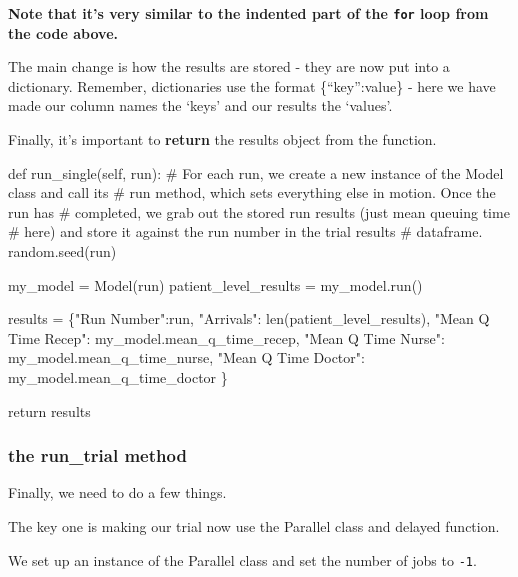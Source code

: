 \documentclass[
  letterpaper,
  DIV=11,
  numbers=noendperiod]{scrreprt}
\newenvironment{Shaded}{\begin{snugshade}}{\end{snugshade}}
\newcommand{\BuiltInTok}[1]{\textcolor[rgb]{0.00,0.23,0.31}{#1}}
\newcommand{\CommentTok}[1]{\textcolor[rgb]{0.37,0.37,0.37}{#1}}
\newcommand{\ControlFlowTok}[1]{\textcolor[rgb]{0.00,0.23,0.31}{#1}}
\newcommand{\KeywordTok}[1]{\textcolor[rgb]{0.00,0.23,0.31}{#1}}
\newcommand{\NormalTok}[1]{\textcolor[rgb]{0.00,0.23,0.31}{#1}}
\newcommand{\OperatorTok}[1]{\textcolor[rgb]{0.37,0.37,0.37}{#1}}
\newcommand{\StringTok}[1]{\textcolor[rgb]{0.13,0.47,0.30}{#1}}
\newcommand{\VariableTok}[1]{\textcolor[rgb]{0.07,0.07,0.07}{#1}}
\begin{document}
\textbf{Note that it's very similar to the indented part of the
\texttt{for} loop from the code above.}

The main change is how the results are stored - they are now put into a
dictionary. Remember, dictionaries use the format \{``key'':value\} -
here we have made our column names the `keys' and our results the
`values'.

Finally, it's important to \textbf{return} the results object from the
function.

\begin{Shaded}
\begin{Highlighting}[]
\KeywordTok{def}\NormalTok{ run\_single(}\VariableTok{self}\NormalTok{, run):}
    \CommentTok{\# For each run, we create a new instance of the Model class and call its}
    \CommentTok{\# run method, which sets everything else in motion.  Once the run has}
    \CommentTok{\# completed, we grab out the stored run results (just mean queuing time}
    \CommentTok{\# here) and store it against the run number in the trial results}
    \CommentTok{\# dataframe.}
\NormalTok{    random.seed(run)}

\NormalTok{    my\_model }\OperatorTok{=}\NormalTok{ Model(run)}
\NormalTok{    patient\_level\_results }\OperatorTok{=}\NormalTok{ my\_model.run()}

\NormalTok{    results }\OperatorTok{=}\NormalTok{ \{}\StringTok{"Run Number"}\NormalTok{:run,}
        \StringTok{"Arrivals"}\NormalTok{: }\BuiltInTok{len}\NormalTok{(patient\_level\_results),}
        \StringTok{"Mean Q Time Recep"}\NormalTok{: my\_model.mean\_q\_time\_recep,}
        \StringTok{"Mean Q Time Nurse"}\NormalTok{: my\_model.mean\_q\_time\_nurse,}
        \StringTok{"Mean Q Time Doctor"}\NormalTok{: my\_model.mean\_q\_time\_doctor}
\NormalTok{        \}}

    \ControlFlowTok{return}\NormalTok{ results}
\end{Highlighting}
\end{Shaded}

\subsubsection{the run\_trial method}\label{the-run_trial-method-5}

Finally, we need to do a few things.

The key one is making our trial now use the Parallel class and delayed
function.

We set up an instance of the Parallel class and set the number of jobs
to \texttt{-1}.
\end{document}
